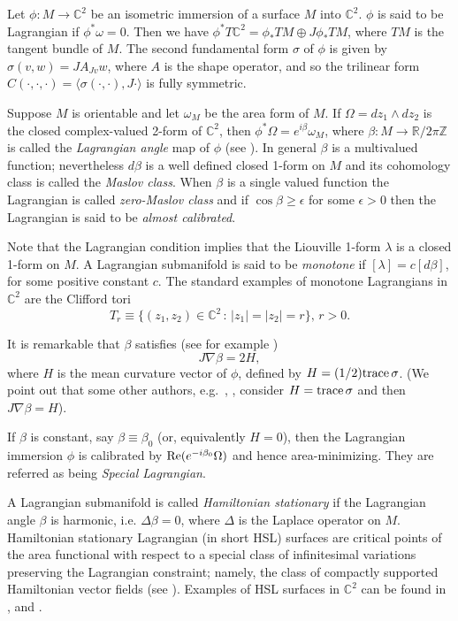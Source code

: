 \documentclass[leqno,11pt]{amsart}
\begin{document}
Let $\phi:M \rightarrow {\mathbb{C}}^2$ be an isometric immersion of a surface $M$ into ${\mathbb{C}}^2$. $\phi $ is
said to be Lagrangian if  $\phi^* \omega = 0$.  Then we have $\phi^* T{\mathbb{C}}^2 =\phi_* TM \oplus J
\phi_* T M$, where $TM$ is the tangent bundle of $M$. The second fundamental form $\sigma $ of
$\phi $ is given by $\sigma (v,w)=JA_{Jv}w$, where $A$ is the shape operator, and so the trilinear
form $C(\cdot,\cdot,\cdot)=\langle \sigma(\cdot,\cdot), J \cdot \rangle $ is fully symmetric.

Suppose $M$ is orientable and let $\omega_M$ be the area form of
$M$. If $\Omega = dz_1 \wedge dz_2$ is the closed complex-valued
2-form of ${\mathbb{C}}^2$, then $\phi^* \Omega = e^{i\beta} \omega_M$,
where $\beta:M\rightarrow {\mathbb{R}} /2\pi {\mathbb{Z}}$ is called the {\em
Lagrangian angle} map of $\phi$ (see \cite{HL}).  In general
$\beta $ is a multivalued function; nevertheless $d\beta $ is a
well defined closed 1-form on $M$ and its cohomology class is
called the {\em Maslov class}. When $\beta $ is a single valued
function the Lagrangian is called {\em zero-Maslov class} and if
$\cos\beta \geq \epsilon$ for some $\epsilon >0$ then the
Lagrangian is said to be {\em almost calibrated}.

Note that the Lagrangian condition implies that the Liouville
1-form $\lambda $ is a closed 1-form on $M$. A Lagrangian
submanifold is said to be {\em monotone} if $[\lambda]=c[d\beta]$,
for some positive constant $c$. The standard examples of monotone
Lagrangians in ${\mathbb{C}}^2$ are the Clifford tori
\[
T_r\equiv \{ (z_1,z_2)\in {\mathbb{C}}^2 \,:\, |z_1|=|z_2|=r \}, \, r>0.
\]

It is remarkable that $\beta$ satisfies (see for example
\cite{SW})
\begin{equation}\label{beta}
J\nabla\beta=2H,
\end{equation}
where $H$ is the mean curvature vector of $\phi$, defined by
$H=(1/2) {\rm trace} \, \sigma$. (We point out that some other
authors, e.g.\ \cite{LW1}, \cite{LW2}, consider $H= {\rm trace} \,
\sigma$ and then $J\nabla\beta=H$).

If $\beta $ is constant, say $\beta\equiv \beta_0$ (or,
equivalently $H=0$), then the Lagrangian immersion $\phi $ is
calibrated by ${\rm Re} (e^{-i\beta_0}\Omega)$ and hence
area-minimizing. They are referred as being {\em Special
Lagrangian}.

A Lagrangian submanifold is called {\em Hamiltonian stationary} if
the Lagrangian angle $\beta $ is harmonic, i.e. $\Delta \beta =0$,
where $\Delta $ is the Laplace operator on $M$. Hamiltonian
stationary Lagrangian (in short HSL) surfaces are critical points
of the area functional with respect to a special class of
infinitesimal variations preserving the Lagrangian constraint;
namely, the class of compactly supported Hamiltonian vector fields
(see \cite{O}). Examples of HSL surfaces in ${\mathbb{C}}^2$ can be found in
\cite{AC}, \cite{CU2} and \cite{HR1}.
\end{document}
